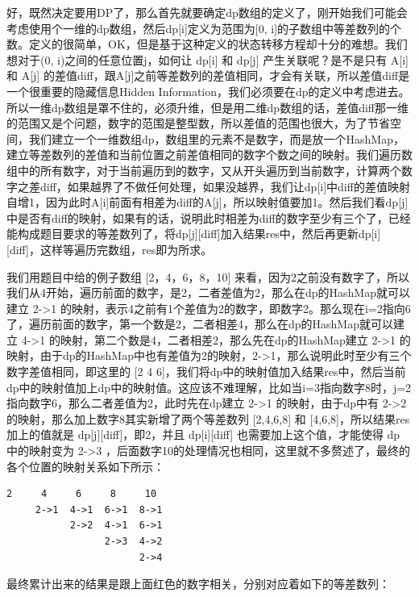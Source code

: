 \documentclass[9pt, b5paaper]{book}
\begin{document}
好，既然决定要用DP了，那么首先就要确定dp数组的定义了，刚开始我们可能会考虑使用个一维的dp数组，然后dp[i]定义为范围为[0, i]的子数组中等差数列的个数。定义的很简单，OK，但是基于这种定义的状态转移方程却十分的难想。我们想对于(0, i)之间的任意位置j，如何让 dp[i] 和 dp[j] 产生关联呢？是不是只有 A[i] 和 A[j] 的差值diff，跟A[j]之前等差数列的差值相同，才会有关联，所以差值diff是一个很重要的隐藏信息Hidden Information，我们必须要在dp的定义中考虑进去。所以一维dp数组是罩不住的，必须升维，但是用二维dp数组的话，差值diff那一维的范围又是个问题，数字的范围是整型数，所以差值的范围也很大，为了节省空间，我们建立一个一维数组dp，数组里的元素不是数字，而是放一个HashMap，建立等差数列的差值和当前位置之前差值相同的数字个数之间的映射。我们遍历数组中的所有数字，对于当前遍历到的数字，又从开头遍历到当前数字，计算两个数字之差diff，如果越界了不做任何处理，如果没越界，我们让dp[i]中diff的差值映射自增1，因为此时A[i]前面有相差为diff的A[j]，所以映射值要加1。然后我们看dp[j]中是否有diff的映射，如果有的话，说明此时相差为diff的数字至少有三个了，已经能构成题目要求的等差数列了，将dp[j][diff]加入结果res中，然后再更新dp[i][diff]，这样等遍历完数组，res即为所求。

我们用题目中给的例子数组 [2，4，6，8，10] 来看，因为2之前没有数字了，所以我们从4开始，遍历前面的数字，是2，二者差值为2，那么在dp\footnotemark[3]{}的HashMap就可以建立 2->1 的映射，表示4之前有1个差值为2的数字，即数字2。那么现在i=2指向6了，遍历前面的数字，第一个数是2，二者相差4，那么在dp\footnotemark[5]{}的HashMap就可以建立 4->1 的映射，第二个数是4，二者相差2，那么先在dp\footnotemark[5]{}的HashMap建立 2->1 的映射，由于dp\footnotemark[3]{}的HashMap中也有差值为2的映射，2->1，那么说明此时至少有三个数字差值相同，即这里的 [2 4 6]，我们将dp\footnotemark[3]{}中的映射值加入结果res中，然后当前dp\footnotemark[5]{}中的映射值加上dp\footnotemark[3]{}中的映射值。这应该不难理解，比如当i=3指向数字8时，j=2指向数字6，那么二者差值为2，此时先在dp\footnotemark[1]{}建立 2->1 的映射，由于dp\footnotemark[5]{}中有 2->2 的映射，那么加上数字8其实新增了两个等差数列 [2,4,6,8] 和 [4,6,8]，所以结果res加上的值就是 dp[j][diff]，即2，并且 dp[i][diff] 也需要加上这个值，才能使得 dp\footnotemark[1]{} 中的映射变为 2->3 ，后面数字10的处理情况也相同，这里就不多赘述了，最终的各个位置的映射关系如下所示：
\begin{verbatim}
2     4     6     8     10    
     2->1  4->1  6->1  8->1
           2->2  4->1  6->1 
                 2->3  4->2
                       2->4
\end{verbatim}

最终累计出来的结果是跟上面红色的数字相关，分别对应着如下的等差数列：
\end{document}
